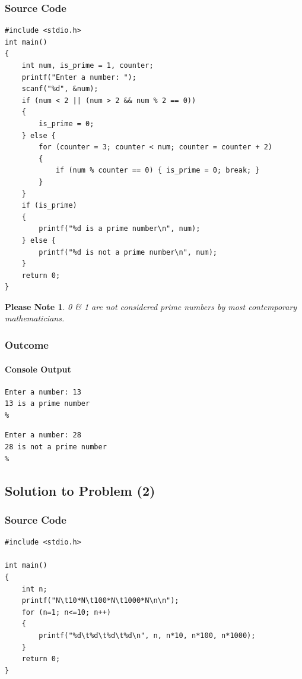 \documentclass[a4paper,11pt]{article}
\theoremstyle{mytheor}
\theoremstyle{mytheor}
\newtheorem{nb}{Please Note}
\begin{document}
\subsubsection{Source Code}
\begin{lstlisting}[escapechar=\^,label={list:first},title=Program's \texttt{C} code | Line numbers for readability]
#include <stdio.h>
int main()
{
    int num, is_prime = 1, counter;
    printf("Enter a number: ");
    scanf("%d", &num);
    if (num < 2 || (num > 2 && num % 2 == 0))
    {
        is_prime = 0;
    } else {
        for (counter = 3; counter < num; counter = counter + 2)
        {
            if (num % counter == 0) { is_prime = 0; break; }
        }
    }
    if (is_prime)
    {
        printf("%d is a prime number\n", num);
    } else {
        printf("%d is not a prime number\n", num);
    }
    return 0;
}
\end{lstlisting}
\begin{nb}
    0 \& 1 are not considered prime numbers by most contemporary mathematicians.
\end{nb}
\subsubsection{Outcome}
\paragraph{Console Output}
\begin{lstlisting}[escapechar=\%,style=output,numbers=none,label={list:second},title=Program's output to console in plaintext -- \texttt{13} as input]
Enter a number: 13
13 is a prime number
%
\end{lstlisting}
\begin{lstlisting}[escapechar=\%,style=output,numbers=none,label={list:second-second},title=Program's output to console in plaintext -- \texttt{28} as input]
Enter a number: 28
28 is not a prime number
%
\end{lstlisting}
\subsection{Solution to Problem (2)}
\subsubsection{Source Code}
\begin{lstlisting}[label={list:third},title=Program's \texttt{C} code -- uses \texttt{for} loop to print out table | Line numbers for readability]
#include <stdio.h>

int main()
{
    int n;
    printf("N\t10*N\t100*N\t1000*N\n\n");
    for (n=1; n<=10; n++)
    {
        printf("%d\t%d\t%d\t%d\n", n, n*10, n*100, n*1000);
    }
    return 0;
}
\end{lstlisting}
\end{document}
